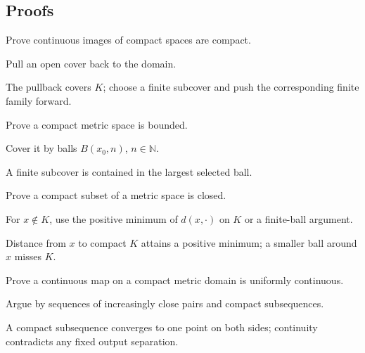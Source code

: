 \subsection*{Proofs}

\begin{exercise}\label{exr:ii06-expand-06}
Prove continuous images of compact spaces are compact.
\end{exercise}
\begin{hint}
Pull an open cover back to the domain.
\end{hint}
\begin{solution}
The pullback covers \(K\); choose a finite subcover and push the corresponding finite family forward.
\end{solution}

\begin{exercise}\label{exr:ii06-expand-07}
Prove a compact metric space is bounded.
\end{exercise}
\begin{hint}
Cover it by balls \(B(x_0,n)\), \(n\in\mathbb N\).
\end{hint}
\begin{solution}
A finite subcover is contained in the largest selected ball.
\end{solution}

\begin{exercise}\label{exr:ii06-expand-08}
Prove a compact subset of a metric space is closed.
\end{exercise}
\begin{hint}
For \(x\notin K\), use the positive minimum of \(d(x,\cdot)\) on \(K\) or a finite-ball argument.
\end{hint}
\begin{solution}
Distance from \(x\) to compact \(K\) attains a positive minimum; a smaller ball around \(x\) misses \(K\).
\end{solution}

\begin{exercise}\label{exr:ii06-expand-09}
Prove a continuous map on a compact metric domain is uniformly continuous.
\end{exercise}
\begin{hint}
Argue by sequences of increasingly close pairs and compact subsequences.
\end{hint}
\begin{solution}
A compact subsequence converges to one point on both sides; continuity contradicts any fixed output separation.
\end{solution}

